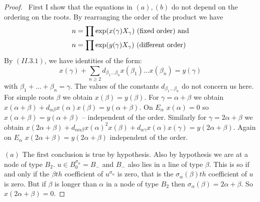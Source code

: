 \documentclass{memo-l}
\theoremstyle{definition}
\theoremstyle{remark}
\numberwithin{section}{chapter}
\numberwithin{equation}{chapter}
\begin{document}
\begin{proof} \ First I show that the equations in $(a),(b)$ do not
depend on the ordering on the roots.  By rearranging the order of the
product we have
$$
\aligned
n & = \prod \exp(x({\gamma})X_{{\gamma}})\ {\text{(fixed\ order)\ and}}\\
n & = \prod \exp(y({\gamma})X_{{\gamma}})\ {\text{(different\ order)}}
\endaligned
$$
By $(II.3.1)$, we have identities of the form:
$$
x({\gamma}) + \sum_{n \ge 2} d_{{\beta}_{1}\ldots
{\beta}_{n}} x({\beta}_{1})\ldots x({\beta}_{n}) = y({\gamma})
$$
with ${\beta}_{1}+\ldots +{\beta}_{n} = {\gamma}$.  The values of the
constants $d_{{\beta}_{1}\ldots {\beta}_{n}}$ do not concern us here.
For simple roots ${\beta}$ we obtain $x({\beta}) = y({\beta})$.  For
${\gamma} = {\alpha}+{\beta}$ we obtain $x({\alpha}+{\beta}) +
d_{{\alpha}{\beta}}x({\alpha})x({\beta}) = y({\alpha}+{\beta})$.  On
$E_{{\alpha}}$ $x({\alpha}) = 0$ so $x({\alpha}+{\beta}) =
y({\alpha}+{\beta})$ -- independent of the order.  Similarly for ${\gamma} =
2{\alpha}+{\beta}$ we obtain $x(2{\alpha}+{\beta}) +
d_{{\alpha}{\alpha}{\beta}}x({\alpha})^{2}x({\beta}) +
d_{{\alpha}{\gamma}}x({\alpha})x({\gamma}) = y(2{\alpha}+{\beta})$.  Again
on $E_{{\alpha}}$ $x(2{\alpha}+{\beta}) = y(2{\alpha}+{\beta})$ independent
of the order.

   $(a)$ The first conclusion is true by hypothesis.  Also by hypothesis we
are at a node of type $B_{2}$.  $u  \in  B_{0}^{{\sigma}_{{\alpha}}} = 
B_{-}$ and $B_{-}$ also lies in a line of type ${\beta}$.  This is so if
and only if the ${\beta}th$ coefficient of $u^{{\sigma}_{{\alpha}}}$
is zero, that is the ${\sigma}_{{\alpha}}({\beta})th$ coefficient of $u$ is
zero.  But if ${\beta}$ is longer than ${\alpha}$ in a node of type $B_{2}$
then ${\sigma}_{{\alpha}}({\beta}) = 2{\alpha}+{\beta}$.  So
$x(2{\alpha}+{\beta}) = 0$.


\end{proof}
\end{document}
